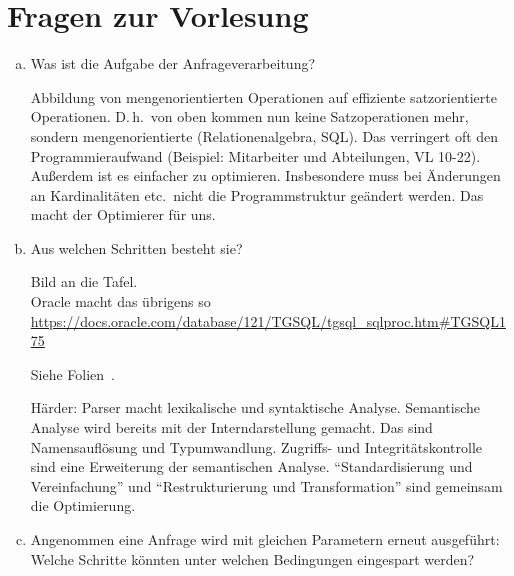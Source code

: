 \section{Fragen zur Vorlesung}

\begin{enumerate}[a)]
	\item Was ist die Aufgabe der Anfrageverarbeitung?

	\begin{solution}
	Abbildung von mengenorientierten Operationen auf effiziente satzorientierte Operationen.
	D.\,h.\ von oben kommen nun keine Satzoperationen mehr, sondern mengenorientierte (Relationenalgebra, SQL).
	Das verringert oft den Programmieraufwand (Beispiel: Mitarbeiter und Abteilungen, VL 10-22).
	Außerdem ist es einfacher zu optimieren.
	Insbesondere muss bei Änderungen an Kardinalitäten etc.\ nicht die Programmstruktur geändert werden.
	Das macht der Optimierer für uns.
	\end{solution}

	\item Aus welchen Schritten besteht sie?

	\begin{note}
	Bild an die Tafel.\\
	Oracle macht das übrigens so 	\url{https://docs.oracle.com/database/121/TGSQL/tgsql_sqlproc.htm\#TGSQL175}
	\end{note}
	\beamertxt{\pagebreak}

	\begin{solution}
	Siehe Folien~\Anfrageverarbeitung.

	Härder:
		Parser macht lexikalische und syntaktische Analyse.
		Semantische Analyse wird bereits mit der Interndarstellung gemacht.
		Das sind Namensauflösung und Typumwandlung.
		Zugriffs- und Integritätskontrolle sind eine Erweiterung der semantischen Analyse.
		"`Standardisierung und Vereinfachung"' und "`Restrukturierung und Transformation"' sind gemeinsam die Optimierung.
	\end{solution}

	\item Angenommen eine Anfrage wird mit gleichen Parametern erneut ausgeführt: Welche Schritte könnten unter welchen Bedingungen eingespart werden?


\end{enumerate}
